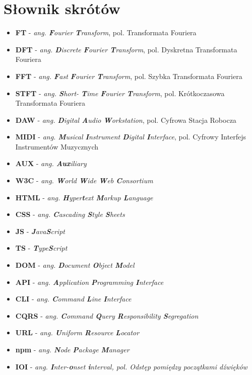 \documentclass[12pt,a4paper,twoside]{mwart}
\begin{document}
\section{Słownik skrótów}
\begin{itemize}
  \item \textbf{FT} - \textit{ang. \textbf{F}ourier \textbf{T}ransform}, pol. Transformata Fouriera
  \item \textbf{DFT} - \textit{ang. \textbf{D}iscrete \textbf{F}ourier \textbf{T}ransform}, pol. Dyskretna Transformata Fouriera
  \item \textbf{FFT} - \textit{ang. \textbf{F}ast \textbf{F}ourier \textbf{T}ransform}, pol. Szybka Transformata Fouriera
  \item \textbf{STFT} - \textit{ang. \textbf{S}hort- \textbf{T}ime \textbf{F}ourier \textbf{T}ransform}, pol. Krótkoczasowa Transformata Fouriera
  \item \textbf{DAW} - \textit{ang. \textbf{D}igital \textbf{A}udio \textbf{W}orkstation}, pol. Cyfrowa Stacja Robocza 
  \item \textbf{MIDI} - \textit{ang. \textbf{M}usical \textbf{I}nstrument \textbf{D}igital \textbf{I}nterface}, pol. Cyfrowy Interfejs Instrumentów Muzycznych
  \item \textbf{AUX} - \textit{ang. \textbf{Aux}iliary}
  \item \textbf{W3C} - \textit{ang. \textbf{W}orld \textbf{W}ide \textbf{W}eb \textbf{C}onsortium}
  \item \textbf{HTML} - \textit{ang. \textbf{H}yper\textbf{t}ext \textbf{M}arkup \textbf{L}anguage}
  \item \textbf{CSS} - \textit{ang.  \textbf{C}ascading \textbf{S}tyle \textbf{S}heets}
  \item \textbf{JS} - \textit{\textbf{J}ava\textbf{S}cript}
  \item \textbf{TS} - \textit{\textbf{T}ype\textbf{S}cript}
  \item \textbf{DOM} - \textit{ang. \textbf{D}ocument \textbf{O}bject \textbf{M}odel}
  \item \textbf{API} - \textit{ang. \textbf{A}pplication \textbf{P}rogramming \textbf{I}nterface}
  \item \textbf{CLI} - \textit{ang. \textbf{C}ommand \textbf{L}ine \textbf{I}nterface}
  \item \textbf{CQRS} - \textit{ang. \textbf{C}ommand \textbf{Q}uery \textbf{R}esponsibility \textbf{S}egregation}
  \item \textbf{URL} - \textit{ang. \textbf{U}niform \textbf{R}esource \textbf{L}ocator }
  \item \textbf{npm} - \textit{ang. \textbf{N}ode \textbf{P}ackage \textbf{M}anager}
  \item \textbf{IOI} - \textit{ang. \textbf{I}nter-\textbf{o}nset \textbf{i}nterval, pol. Odstęp pomiędzy początkami dźwięków}
\end{itemize}
\newpage
\setcounter{secnumdepth}{2}
\end{document}

